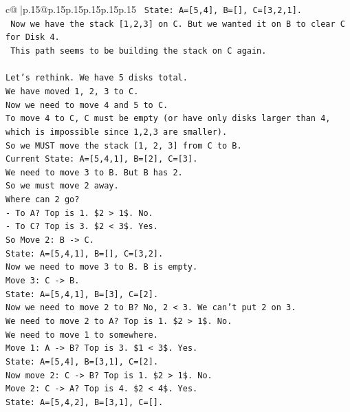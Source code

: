 \documentclass{article}
\begin{document}
{\begin{supertabular}{c@{$\;$}|p{.15\linewidth}@{}p{.15\linewidth}p{.15\linewidth}p{.15\linewidth}p{.15\linewidth}p{.15\linewidth}}
{{{\texttt{   State: A={[}5,4{]}, B={[}{]}, C={[}3,2,1{]}.} \\
\texttt{   Now we have the stack {[}1,2,3{]} on C. But we wanted it on B to clear C for Disk 4.} \\
\texttt{   This path seems to be building the stack on C again.} \\
\\ 
\texttt{Let's rethink. We have 5 disks total.} \\
\texttt{We have moved 1, 2, 3 to C.} \\
\texttt{Now we need to move 4 and 5 to C.} \\
\texttt{To move 4 to C, C must be empty (or have only disks larger than 4, which is impossible since 1,2,3 are smaller).} \\
\texttt{So we MUST move the stack {[}1, 2, 3{]} from C to B.} \\
\texttt{Current State: A={[}5,4,1{]}, B={[}2{]}, C={[}3{]}.} \\
\texttt{We need to move 3 to B. But B has 2.} \\
\texttt{So we must move 2 away.} \\
\texttt{Where can 2 go?} \\
\texttt{{-} To A? Top is 1. \$2 > 1\$. No.} \\
\texttt{{-} To C? Top is 3. \$2 < 3\$. Yes.} \\
\texttt{So Move 2: B {-}> C.} \\
\texttt{State: A={[}5,4,1{]}, B={[}{]}, C={[}3,2{]}.} \\
\texttt{Now we need to move 3 to B. B is empty.} \\
\texttt{Move 3: C {-}> B.} \\
\texttt{State: A={[}5,4,1{]}, B={[}3{]}, C={[}2{]}.} \\
\texttt{Now we need to move 2 to B? No, 2 < 3. We can't put 2 on 3.} \\
\texttt{We need to move 2 to A? Top is 1. \$2 > 1\$. No.} \\
\texttt{We need to move 1 to somewhere.} \\
\texttt{Move 1: A {-}> B? Top is 3. \$1 < 3\$. Yes.} \\
\texttt{State: A={[}5,4{]}, B={[}3,1{]}, C={[}2{]}.} \\
\texttt{Now move 2: C {-}> B? Top is 1. \$2 > 1\$. No.} \\
\texttt{Move 2: C {-}> A? Top is 4. \$2 < 4\$. Yes.} \\
\texttt{State: A={[}5,4,2{]}, B={[}3,1{]}, C={[}{]}.} \\
}}}
\end{supertabular}}
\end{document}
